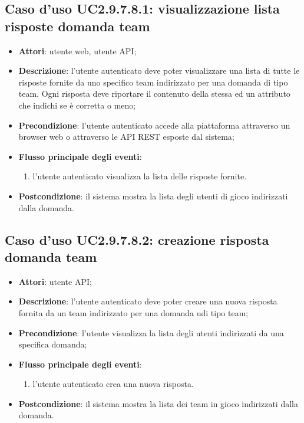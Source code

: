 \subsection{Caso d'uso UC2.9.7.8.1: visualizzazione lista risposte domanda team}
\begin{itemize}
\item \textbf{Attori}: utente web, utente API;
\item \textbf{Descrizione}: l'utente autenticato deve poter visualizzare una lista di tutte le risposte fornite da uno specifico team indirizzato per una domanda di tipo team. Ogni risposta deve riportare il contenuto della stessa ed un attributo che indichi se è corretta o meno; 
      \item \textbf{Precondizione}: 	l'utente autenticato accede alla piattaforma attraverso un browser web o attraverso le API REST esposte dal sistema;

        \item \textbf{Flusso principale degli eventi}:
          \begin{enumerate}
          \item l'utente autenticato visualizza la lista delle risposte fornite.

      \end{enumerate}
    \item \textbf{Postcondizione}: il sistema mostra la lista degli utenti di gioco indirizzati dalla domanda.
  \end{itemize}
\hypertarget{UC2.9.7.8.2}{}
\subsection{Caso d'uso UC2.9.7.8.2: creazione risposta domanda team}
\begin{itemize}
\item \textbf{Attori}: utente API;
\item \textbf{Descrizione}: l'utente autenticato deve poter creare una nuova risposta fornita da un team indirizzato per una domanda udi tipo team; 
      \item \textbf{Precondizione}: l'utente visualizza la lista degli utenti indirizzati da una specifica domanda;

        \item \textbf{Flusso principale degli eventi}:
          \begin{enumerate}
          \item l'utente autenticato crea una nuova risposta.

      \end{enumerate}
    \item \textbf{Postcondizione}: il sistema mostra la lista dei team in gioco indirizzati dalla domanda.
  \end{itemize}
\hypertarget{UC3}{}
